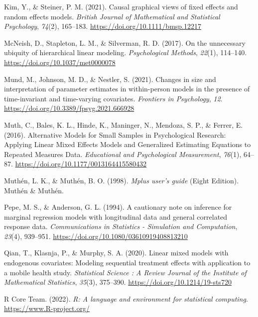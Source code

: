 \documentclass[
  12pt,
  a4paper,
]{article}
\newlength{\cslhangindent}
\newenvironment{CSLReferences}[2] %
 {\begin{list}{}{%
  \setlength{\itemindent}{0pt}
  \setlength{\leftmargin}{0pt}
  \setlength{\parsep}{0pt}
  \ifodd #1
   \setlength{\leftmargin}{\cslhangindent}
   \setlength{\itemindent}{-1\cslhangindent}
  \fi
  \setlength{\itemsep}{#2\baselineskip}}}
 {\end{list}}
\begin{document}
\begin{CSLReferences}{1}{0}
Kim, Y., \& Steiner, P. M. (2021). Causal graphical views of fixed
effects and random effects models. \emph{British Journal of Mathematical
and Statistical Psychology}, \emph{74}(2), 165--183.
\url{https://doi.org/10.1111/bmsp.12217}

McNeish, D., Stapleton, L. M., \& Silverman, R. D. (2017). On the
unnecessary ubiquity of hierarchical linear modeling.
\emph{Psychological Methods}, \emph{22}(1), 114--140.
\url{https://doi.org/10.1037/met0000078}

Mund, M., Johnson, M. D., \& Nestler, S. (2021). Changes in size and
interpretation of parameter estimates in within-person models in the
presence of time-invariant and time-varying covariates. \emph{Frontiers
in Psychology}, \emph{12}.
\url{https://doi.org/10.3389/fpsyg.2021.666928}

Muth, C., Bales, K. L., Hinde, K., Maninger, N., Mendoza, S. P., \&
Ferrer, E. (2016). Alternative Models for Small Samples in Psychological
Research: Applying Linear Mixed Effects Models and Generalized
Estimating Equations to Repeated Measures Data. \emph{Educational and
Psychological Measurement}, \emph{76}(1), 64--87.
\url{https://doi.org/10.1177/0013164415580432}

Muthén, L. K., \& Muthén, B. O. (1998). \emph{Mplus user's guide} (Eight
Edition). Muthén \& Muthén.

Pepe, M. S., \& Anderson, G. L. (1994). A cautionary note on inference
for marginal regression models with longitudinal data and general
correlated response data. \emph{Communications in Statistics -
Simulation and Computation}, \emph{23}(4), 939--951.
\url{https://doi.org/10.1080/03610919408813210}

Qian, T., Klasnja, P., \& Murphy, S. A. (2020). Linear mixed models with
endogenous covariates: Modeling sequential treatment effects with
application to a mobile health study. \emph{Statistical Science : A
Review Journal of the Institute of Mathematical Statistics},
\emph{35}(3), 375--390. \url{https://doi.org/10.1214/19-sts720}

R Core Team. (2022). \emph{R: A language and environment for statistical
computing}. \url{https://www.R-project.org/}


\end{CSLReferences}
\end{document}

